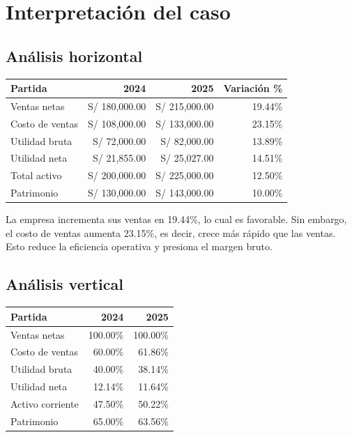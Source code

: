 \section{Interpretación del caso}

\subsection{Análisis horizontal}

\begin{center}
\begin{tabular}{lrrr}
\toprule
Partida & 2024 & 2025 & Variación \% \\
\midrule
Ventas netas & S/ 180,000.00 & S/ 215,000.00 & 19.44\% \\
Costo de ventas & S/ 108,000.00 & S/ 133,000.00 & 23.15\% \\
Utilidad bruta & S/ 72,000.00 & S/ 82,000.00 & 13.89\% \\
Utilidad neta & S/ 21,855.00 & S/ 25,027.00 & 14.51\% \\
Total activo & S/ 200,000.00 & S/ 225,000.00 & 12.50\% \\
Patrimonio & S/ 130,000.00 & S/ 143,000.00 & 10.00\% \\
\bottomrule
\end{tabular}
\end{center}

La empresa incrementa sus ventas en 19.44\%, lo cual es favorable. Sin embargo, el costo de ventas aumenta 23.15\%, es decir, crece más rápido que las ventas. Esto reduce la eficiencia operativa y presiona el margen bruto.

\subsection{Análisis vertical}

\begin{center}
\begin{tabular}{lrr}
\toprule
Partida & 2024 & 2025 \\
\midrule
Ventas netas & 100.00\% & 100.00\% \\
Costo de ventas & 60.00\% & 61.86\% \\
Utilidad bruta & 40.00\% & 38.14\% \\
Utilidad neta & 12.14\% & 11.64\% \\
Activo corriente & 47.50\% & 50.22\% \\
Patrimonio & 65.00\% & 63.56\% \\
\bottomrule
\end{tabular}
\end{center}

